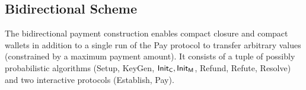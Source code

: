 \documentclass[11pt]{report}
\begin{document}
\subsection{Bidirectional Scheme}

The bidirectional payment construction enables compact closure and compact wallets in addition to a single run of the {\sf Pay} protocol to transfer arbitrary values (constrained by a maximum payment amount). It consists of a tuple of possibly probabilistic algorithms ({\sf Setup}, {\sf KeyGen}, ${\sf Init}_{\sf C}, {\sf Init}_{\sf M}$, {\sf Refund}, {\sf Refute}, {\sf Resolve}) and two interactive protocols ({\sf Establish}, {\sf Pay}).
\end{document}
